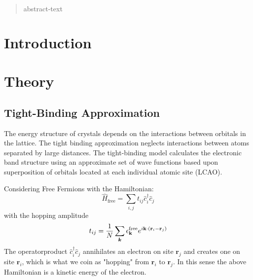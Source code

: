 \documentclass[11pt, a4paper]{article}
\theoremstyle{definition} %
\newcommand{\vc}{\vb*}
\begin{document}
\begin{abstract}
    abstract-text
\end{abstract}

\newpage
\tableofcontents
\newpage


	\section{Introduction}
	
	\section{Theory}
	
	\subsection{Tight-Binding Approximation}
	
	The energy structure of crystals depends on the interactions between orbitals in the lattice. The tight binding approximation neglects interactions between atoms separated by large distances. The tight-binding model calculates the electronic band structure using an approximate set of wave functions based upon superposition of orbitals located at each individual atomic site (LCAO).
	
	Considering Free Fermions with the Hamiltonian:
	\begin{equation}
		\hat{H}_\text{free} = \sum_{i,j} t_{ij} \hat{c}_i^\dagger \hat{c}_j
	\end{equation}
	with the hopping amplitude
	\begin{equation}
		t_{ij} = \frac{1}{N} \sum_{\vc{k}} \epsilon_{\mathbf{k}}^\text{free} e^{i \mathbf{k}\cdot (\mathbf{r}_i - \mathbf{r}_j)}
	\end{equation}
	The operatorproduct $\hat{c}_i^\dagger \hat{c}_j$ annihilates an electron on site $\mathbf{r}_j$ and creates one on site $\mathbf{r}_i$, which is what we coin as "hopping" from $\mathbf{r}_i$ to $\mathbf{r}_j$. In this sense the above Hamiltonian is a kinetic energy of the electron. \\
	
\end{document}
